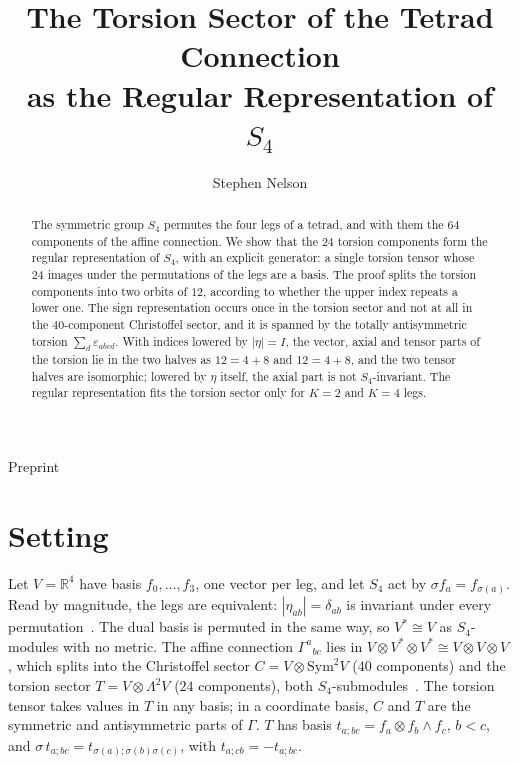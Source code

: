\documentclass[twocolumn]{iopjournal}
\renewcommand{\articletype}[1]{%
  {\vspace*{-8mm}\noindent \Large \sf Preprint}\par
  \vspace*{6mm}\noindent{\scriptsize \sf{\bfseries \MakeUppercase{#1}}}}
\begin{document}
\articletype{Supplementary Material}

\title{The Torsion Sector of the Tetrad Connection\\
as the Regular Representation of $S_4$}

\author{Stephen Nelson}



\begin{abstract}
The symmetric group $S_4$ permutes the four legs of a tetrad, and
with them the $64$ components of the affine connection. We show that
the $24$ torsion components form the regular representation of
$S_4$, with an explicit generator: a single torsion tensor whose $24$
images under the permutations of the legs are a basis. The proof
splits the torsion components into two orbits of $12$, according to
whether the upper index repeats a lower one. The sign representation occurs once in the torsion
sector and not at all in the $40$-component Christoffel sector, and
it is spanned by the totally antisymmetric torsion
$\sum_d \varepsilon_{abcd}$. With indices lowered by $|\eta| = I$,
the vector, axial and tensor parts of the torsion lie in the two
halves as $12 = 4 + 8$ and $12 = 4 + 8$, and the two tensor halves
are isomorphic; lowered by $\eta$ itself, the axial part is not
$S_4$-invariant. The regular representation fits the torsion sector
only for $K = 2$ and $K = 4$ legs.
\end{abstract}



\section*{Setting}

Let $V = \mathbb{R}^4$ have basis $f_0, \dots, f_3$, one vector per
leg, and let $S_4$ act by $\sigma f_a = f_{\sigma(a)}$. Read by
magnitude, the legs are equivalent: $|\eta_{ab}| = \delta_{ab}$ is
invariant under every permutation~\cite{Nelson2026frame}. The dual
basis is permuted in the same way, so $V^* \cong V$ as
$S_4$-modules with no metric. The affine connection
$\Gamma^a{}_{bc}$ lies in $V \otimes V^* \otimes V^* \cong V \otimes V
\otimes V$, which splits into
the Christoffel sector $C = V \otimes \mathrm{Sym}^2 V$
($40$ components) and the torsion sector
$T = V \otimes \Lambda^2 V$ ($24$ components), both
$S_4$-submodules~\cite{Hehl1976}. The torsion tensor takes values in
$T$ in any basis; in a coordinate basis, $C$ and $T$ are the symmetric
and antisymmetric parts of $\Gamma$. $T$ has basis
$t_{a;bc} = f_a \otimes f_b \wedge f_c$, $b < c$, and
$\sigma\, t_{a;bc} = t_{\sigma(a);\sigma(b)\sigma(c)}$, with
$t_{a;cb} = -t_{a;bc}$.
\end{document}
